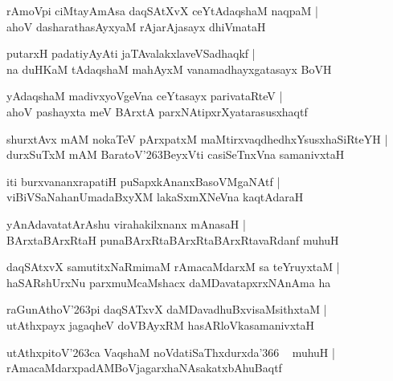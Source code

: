 \documentclass[twoside,12pt,openright]{book}
\def\S{\char'263}
\newcounter{shloka}[chapter]
\begin{document}
\begin{shloka}%
rAmoVpi ciMtayAmAsa daqSAtXvX ceYtAdaqshaM naqpaM |\\
ahoV dasharathasAyxyaM rAjarAjasayx dhiVmataH 
\end{shloka}

\begin{shloka}%
putarxH padatiyAyAti jaTAvalakxlaveVSadhaqkf |\\
na duHKaM tAdaqshaM mahAyxM vanamadhayxgatasayx BoVH
\end{shloka}

\begin{shloka}%
yAdaqshaM madivxyoVgeVna ceYtasayx parivataRteV |\\
ahoV pashayxta meV BArxtA parxNAtipxrXyatarasusxhaqtf
\end{shloka}

\begin{shloka}%
shurxtAvx mAM nokaTeV pArxpatxM maMtirxvaqdhedhxYsusxhaSiRteYH |\\
durxSuTxM mAM BaratoV\S BeyxVti casiSeTnxVna samanivxtaH
\end{shloka}

\begin{shloka}%
iti burxvananxrapatiH puSapxkAnanxBasoVMgaNAtf |\\
viBiVSaNahanUmadaBxyXM lakaSxmXNeVna kaqtAdaraH 
\end{shloka}

\begin{shloka}%
yAnAdavatatArAshu virahakilxnanx mAnasaH |\\
BArxtaBArxRtaH punaBArxRtaBArxRtaBArxRtavaRdanf muhuH
\end{shloka}

\begin{shloka}%
daqSAtxvX samutitxNaRmimaM rAmacaMdarxM sa teYruyxtaM |\\
haSARshUrxNu parxmuMcaMshacx daMDavatapxrxNAnAma ha 
\end{shloka}

\begin{shloka}%
raGunAthoV\S pi daqSATxvX daMDavadhuBxvisaMsithxtaM |\\
utAthxpayx jagaqheV doVBAyxRM hasARloVkasamanivxtaH
\end{shloka}

\begin{shloka}%
utAthxpitoV\S ca VaqshaM noVdatiSaThxdurxda\char'366 ~ muhuH |\\
rAmacaMdarxpadAMBoVjagarxhaNAsakatxbAhuBaqtf
\end{shloka}
\end{document}
